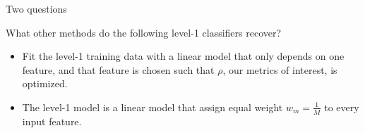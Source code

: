 \documentclass[11pt,compress,t,notes=noshow, xcolor=table]{beamer}
\begin{document}

\begin{vbframe}{Two questions}

\vfill
What other methods do the following level-1 classifiers recover?
\vfill
\begin{itemize}
    \item Fit the level-1 training data with a linear model that only depends on one feature, and that feature is chosen such that $\rho$, our metrics of interest, is optimized.
    \item The level-1 model is a linear model that assign equal weight $w_{m} = \frac{1}{M}$ to every input feature.
\end{itemize}
\vfill
    
\end{vbframe}

\end{document}
